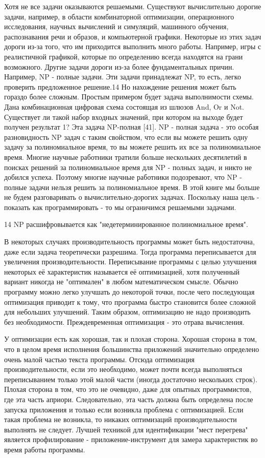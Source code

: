 Хотя не все задачи оказываются решаемыми. Существуют вычислительно дорогие задачи, например, в области комбинаторной оптимизации, операционного исследования, научных вычислений и симуляций, машинного обучения, распознавания речи и образов, и компьютерной графики. Некоторые из этих задач дороги из-за того, что им приходится выполнить много работы. Например, игры с реалистичной графикой, которые по определению всегда находятся на грани возможного. Другие задачи дороги из-за более фундаментальных причин. Например, NP - полные задачи. Эти задачи принадлежат NP, то есть, легко проверить предложенное решение.14 Но нахождение решения может быть гораздо более сложным. Простым примером будет задача выполнимости схемы. Дана комбинационная цифровая схема состоящая из шлюзов And, Or и Not. Существует ли такой набор входных значений, при котором на выходе будет получен результат 1? Эта задача NP-полная [41]. NP - полная задача - это особая разновидность NP задач с таким свойством, что если вы можете решить одну задачу за полиномиальное время, то вы можете решить их все за полиномиальное время. Многие научные работники тратили больше нескольких десятилетий в поисках решений за полиномиальное время для NP - полных задач, и никто не добился успеха. Поэтому многие научные работники подозревают, что NP - полные задачи нельзя решить за полиномиальное время. В этой книге мы больше не будем разговаривать о вычислительно-дорогих задачах. Поскольку наша цель - показать как программировать - то мы ограничимся решаемыми задачами.

14 NP расшифровывается как "недетерминированное полиномиальное время".

В некоторых случаях производительность программы может быть недостаточна, даже если задача теоретически разрешима. Тогда программа переписывается для увеличения производительности. Переписывание программы с целью улучшения некоторых её характеристик называется её оптимизацией, хотя полученный вариант никогда не "оптимален" в любом математическом смысле. Обычно программу можно легко улучшать до некоторой точки, после чего последующая оптимизация приводит к тому, что программа быстро становится более сложной для небольших улучшений. Таким образом, оптимизацию не надо производить без необходимости. Преждевременная оптимизация - это отрава вычисления.

У оптимизации есть как хорошая, так и плохая сторона. Хорошая сторона в том, что в целом время исполнения большинства приложений значительно определено очень малой частью текста программы. Отсюда оптимизация производительности, если это необходимо, может почти всегда выполняться переписыванием только этой малой части (иногда достаточно нескольких строк). Плохая сторона в том, что это не очевидно, даже для опытных программистов, где эта часть априори. Следовательно, эта часть должна быть определена после запуска приложения и только если возникла проблема с оптимизацией. Если такая проблема не возникла, то никаких оптимизаций производительности выполнять не следует. Лучшей техникой для идентификации "мест перегрева" является профилирование - приложение-инструмент для замера характеристик во время работы программы.

